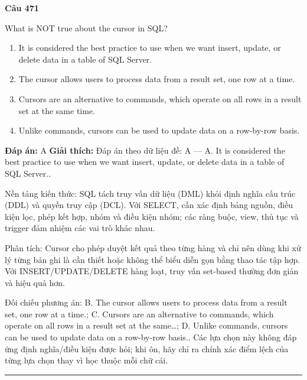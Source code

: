 \documentclass[11pt,a4paper]{article}
\newenvironment{question}[1]{%
  \par\vspace{1em}\noindent\textbf{\large Câu #1}\par\vspace{0.4em}
}{%
  \par\vspace{1em}\hrule\vspace{0.6em}
}
\newenvironment{choices}{%
  \begin{enumerate}[label=\textbf{\Alph*.},leftmargin=2.2em,itemsep=2pt,topsep=3pt]
}{%
  \end{enumerate}
}
\newcommand{\choice}{\item}
\begin{document}
\begin{question}{471}
What is NOT true about the cursor in SQL?
\begin{choices}
\choice It is considered the best practice to use when we want insert, update, or delete data in a table of SQL Server.
\choice The cursor allows users to process data from a result set, one row at a time.
\choice Cursors are an alternative to commands, which operate on all rows in a result set at the same time.
\choice Unlike commands, cursors can be used to update data on a row-by-row basis.
\end{choices}
\textbf{Đáp án:} A
\textbf{Giải thích:} Đáp án theo dữ liệu đề: A — A. It is considered the best practice to use when we want insert, update, or delete data in a table of SQL Server..

Nền tảng kiến thức: SQL tách truy vấn dữ liệu (DML) khỏi định nghĩa cấu trúc (DDL) và quyền truy cập (DCL). Với SELECT, cần xác định bảng nguồn, điều kiện lọc, phép kết hợp, nhóm và điều kiện nhóm; các ràng buộc, view, thủ tục và trigger đảm nhiệm các vai trò khác nhau.

Phân tích: Cursor cho phép duyệt kết quả theo từng hàng và chỉ nên dùng khi xử lý từng bản ghi là cần thiết hoặc không thể biểu diễn gọn bằng thao tác tập hợp. Với INSERT/UPDATE/DELETE hàng loạt, truy vấn set-based thường đơn giản và hiệu quả hơn.

Đối chiếu phương án: B. The cursor allows users to process data from a result set, one row at a time.; C. Cursors are an alternative to commands, which operate on all rows in a result set at the same…; D. Unlike commands, cursors can be used to update data on a row-by-row basis.. Các lựa chọn này không đáp ứng định nghĩa/điều kiện được hỏi; khi ôn, hãy chỉ ra chính xác điểm lệch của từng lựa chọn thay vì học thuộc mỗi chữ cái.
\end{question}
\end{document}
